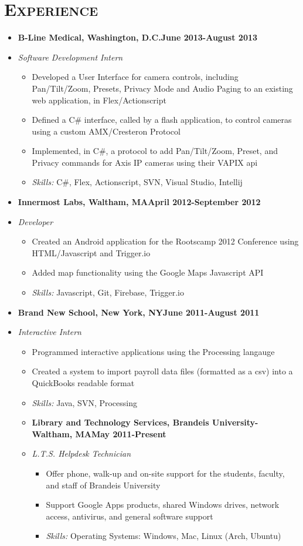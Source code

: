 \documentclass[10pt, oneside]{article}
\newcommand{\lr}[2]{#1\hfill#2}
\newcommand{\skills}[1]{
\item[] \textsl{Skills:} #1
}
\newenvironment{ressection}[1]{
  \section{\normalsize \scshape \selectfont #1 \normalfont}
  \vspace{-4pt}
  \begin{itemize} \itemsep-2pt
  }{
  \end{itemize}
  \vspace{-20pt}
}
\newenvironment{resitem}[4]{
\item[] \lr{\bfseries \selectfont #1\normalfont, #2} {#3}
\item[] \textsl{#4}
  \vspace{-4pt}
  \begin{itemize} \itemsep-2pt
  }{
  \end{itemize}
}
\begin{document}
\begin{ressection}{Experience}
  \begin{resitem}{B-Line Medical}{Washington, D.C.}{June 2013-August 2013}{Software Development Intern}
  \item Developed a User Interface for camera controls, including Pan/Tilt/Zoom, Presets, Privacy Mode and Audio Paging to an existing web application, in Flex/Actionscript
  \item Defined a C\# interface, called by a flash application, to control cameras using a custom AMX/Cresteron Protocol
  \item Implemented, in C\#, a protocol to add Pan/Tilt/Zoom, Preset, and Privacy commands for Axis IP cameras using their VAPIX api
    \skills{C\#, Flex, Actionscript, SVN, Visual Studio, Intellij}
  \end{resitem}
  \begin{resitem}{Innermost Labs}{Waltham, MA}{April 2012-September 2012}{Developer}
  \item Created an Android application for the Rootscamp 2012 Conference using HTML/Javascript and Trigger.io
  \item Added map functionality using the Google Maps Javascript API
    \skills{Javascript, Git, Firebase, Trigger.io}
  \end{resitem}
  \begin{resitem}{Brand New School}{New York, NY}{June 2011-August 2011}{Interactive Intern}
  \item Programmed interactive applications using the Processing langauge
  \item Created a system to import payroll data files (formatted as a csv) into a QuickBooks readable format
    \skills{Java, SVN, Processing}
    \begin{resitem}{Library and Technology Services}{Brandeis University- Waltham, MA}{May 2011-Present}{L.T.S. Helpdesk Technician} 
    \item Offer phone, walk-up and on-site support for the students, faculty, and staff of Brandeis University
    \item Support Google Apps products, shared Windows drives, network access, antivirus, and general software support 
      \skills{Operating Systems: Windows, Mac, Linux (Arch, Ubuntu)}
    \end{resitem}
    
  \end{resitem}

\end{ressection}
\end{document}
